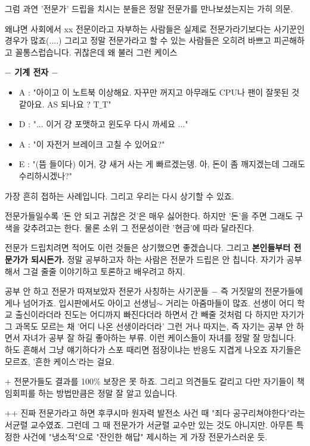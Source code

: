 그럼 과연 '전문가' 드립을 치시는 분들은 정말 전문가를 만나보셨는지는 가히 의문.
\vspace{5mm}

왜냐면 사회에서 xx 전문이라고 자부하는 사람들은 실제로 전문가라기보다는 사기꾼인 경우가 많죠(....)
그리고 정말 전문가라고 할 수 있는 사람들은 오히려 바쁘고 피곤해하고 꼴통스럽습니다. 귀찮은데 왜 불러 그런 케이스
\vspace{5mm}

\textbf{$-$ 기계 전자 $-$}
\vspace{5mm}

\begin{itemize}
    \item[] A : "아이고 이 노트북 이상해요. 자꾸만 꺼지고 아무래도 CPU나 팬이 잘못된 것 같아요. AS 되나요 ? T$\_$T"
    \item[] D : "... 이거 걍 포맷하고 윈도우 다시 까세요 ..."
    \vspace{5mm}
    
    \item[] A : "이 자전거 브레이크 고칠 수 있어요?"
    \item[] E : "(뜸 들이다) 이거, 걍 새거 사는 게 빠르겠는뎅. 아, 돈이 좀 깨지겠는데 그래도 수리하시겠나?"
\end{itemize}
\vspace{5mm}

가장 흔히 접하는 사례입니다.
그리고 우리는 다시 상기할 수 있죠.
\vspace{5mm}

전문가들일수록 '돈 안 되고 귀찮은 것'은 매우 싫어한다.
하지만 '돈'을 주면 그래도 구색을 갖추려고는 한다. 물론 소위 그 전문성이란 '현금'에 따라 달라진다.
\vspace{5mm}

전문가 드립치려면 적어도 이런 것들은 상기했으면 좋겠습니다. 그리고 \textbf{본인들부터 전문가가 되시든가.}
정말 공부하고자 하는 사람은 전문가 드립은 안 칩니다. 자기가 공부해서 그걸 줄줄 이야기하고 토론하고 배우려고 하지.
\vspace{5mm}

공부 안 하고 전문가 따져보았자 전문가 사칭하는 사기꾼들 $-$ 즉 거짓말의 전문가들에게나 넘어가죠.
입시판에서도 아이고 선생님$\sim$ 거리는 아줌마들이 많죠.
선생이 어디 학교 출신이라더라 진도는 어디까지 빠진다더라 하면서 간 빼줄 것처럼 다 하지만
자기가 그 과목도 모르는 채 '어디 나온 선생이라더라' 그런 거나 따지는, 즉 자기는 공부 안 하면서 자녀가 공부 잘 하길 좋아하는 부류.
이런 케이스들이 자녀를 정말 잘 망칩니다. 하도 흔해서 그냥 얘기하다가 스포 때리면 점장이냐는 반응도 지겹게 나오죠
자기들은 모르죠, '흔한 케이스'라는 걸요.
\vspace{5mm}

+
전문가들도 결과를 100$\%$ 보장은 못 하죠. 그리고 의견들도 갈리고
다만 자기들이 책임회피를 하는 방법만큼은 정말 잘 알고 있습니다.
\vspace{5mm}

++
진짜 전문가라고 하면 후쿠시마 원자력 발전소 사건 때 "죄다 공구리쳐야한다"라는 서균렬 교수였죠.
그런데 그 때 전문가가 서균렬 교수만 있는 것도 아니지만. 아무튼 특정한 사건에 "냉소적"으로 "잔인한 해답" 제시하는 게 가장 전문가스러운 듯.
\vspace{5mm}




